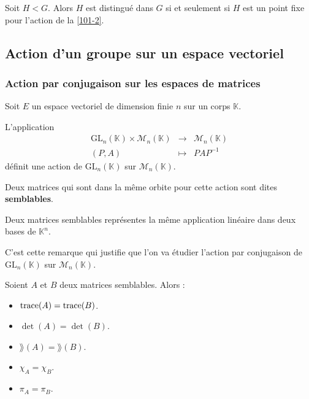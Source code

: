   \begin{proposition}
    Soit $H < G$. Alors $H$ est distingué dans $G$ si et seulement si $H$ est un point fixe pour l'action de la \cref{101-2}.
  \end{proposition}

  \subsection{Action d'un groupe sur un espace vectoriel}

  \subsubsection{Action par conjugaison sur les espaces de matrices}

  Soit $E$ un espace vectoriel de dimension finie $n$ sur un corps $\mathbb{K}$.


  \begin{proposition}
    L'application
    \[
      \begin{array}{ccc}
        \mathrm{GL}_n(\mathbb{K}) \times \mathcal{M}_n(\mathbb{K}) &\rightarrow& \mathcal{M}_n(\mathbb{K}) \\
        (P, A) &\mapsto& PAP^{-1}
      \end{array}
    \]
    définit une action de $\mathrm{GL}_n(\mathbb{K})$ sur $\mathcal{M}_n(\mathbb{K})$.
  \end{proposition}

  \begin{definition}
    Deux matrices qui sont dans la même orbite pour cette action sont dites \textbf{semblables}.
  \end{definition}


  \begin{remark}
    Deux matrices semblables représentes la même application linéaire dans deux bases de $\mathbb{K}^n$.
  \end{remark}

  C'est cette remarque qui justifie que l'on va étudier l'action par conjugaison de $\mathrm{GL}_n(\mathbb{K})$ sur $\mathcal{M}_n(\mathbb{K})$.


  \begin{theorem}
    Soient $A$ et $B$ deux matrices semblables. Alors :
    \begin{itemize}
      \item $\operatorname{trace}(A) = \operatorname{trace}(B)$.
      \item $\det(A) = \det(B)$.
      \item $\rang(A) = \rang(B)$.
      \item $\chi_A = \chi_B$.
      \item $\pi_A = \pi_B$.
    \end{itemize}
  \end{theorem}

